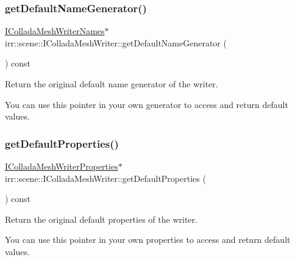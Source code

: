 \subsubsection{\texorpdfstring{get\+Default\+Name\+Generator()}{getDefaultNameGenerator()}\hspace{0.1cm}{\footnotesize\ttfamily [2/2]}}
{\footnotesize\ttfamily \hyperlink{classirr_1_1scene_1_1IColladaMeshWriterNames}{I\+Collada\+Mesh\+Writer\+Names}$\ast$ irr\+::scene\+::\+I\+Collada\+Mesh\+Writer\+::get\+Default\+Name\+Generator (\begin{DoxyParamCaption}{ }\end{DoxyParamCaption}) const\hspace{0.3cm}{\ttfamily [inline]}}



Return the original default name generator of the writer. 

You can use this pointer in your own generator to access and return default values. \mbox{\label{classirr_1_1scene_1_1IColladaMeshWriter_ae5d7e19d6d4bba65bcfb006c011cb6f2}} 
\subsubsection{\texorpdfstring{get\+Default\+Properties()}{getDefaultProperties()}\hspace{0.1cm}{\footnotesize\ttfamily [1/2]}}
{\footnotesize\ttfamily \hyperlink{classirr_1_1scene_1_1IColladaMeshWriterProperties}{I\+Collada\+Mesh\+Writer\+Properties}$\ast$ irr\+::scene\+::\+I\+Collada\+Mesh\+Writer\+::get\+Default\+Properties (\begin{DoxyParamCaption}{ }\end{DoxyParamCaption}) const\hspace{0.3cm}{\ttfamily [inline]}}



Return the original default properties of the writer. 

You can use this pointer in your own properties to access and return default values. \mbox{\label{classirr_1_1scene_1_1IColladaMeshWriter_ae5d7e19d6d4bba65bcfb006c011cb6f2}} 
